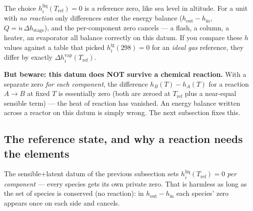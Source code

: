 \documentclass[11pt,a4paper]{article}
\begin{document}
\begin{intuition}
The choice $h^{\mathrm{liq}}_i(T_{\mathrm{ref}}) = 0$ is a reference
zero, like sea level in altitude.  For a unit with \emph{no reaction}
only differences enter the energy balance ($h_{\mathrm{out}} -
h_{\mathrm{in}}$, $Q = \dot{n}\,\Delta h_{\mathrm{stage}}$), and the
per-component zero cancels --- a flash, a column, a heater, an
evaporator all balance correctly on this datum.  If you compare these
$h$ values against a table that picked $h^{\mathrm{ig}}_i(298)=0$ for an
\emph{ideal gas} reference, they differ by exactly
$\Delta h^{\mathrm{vap}}_i(T_{\mathrm{ref}})$.

\textbf{But beware: this datum does NOT survive a chemical reaction.}
With a separate zero \emph{for each component}, the difference
$h_B(T) - h_A(T)$ for a reaction $A\!\to\!B$ at fixed $T$ is essentially
zero (both are zeroed at $T_{\mathrm{ref}}$ plus a near-equal sensible
term) --- the heat of reaction has vanished.  An energy balance written
across a reactor on this datum is simply wrong.  The next subsection
fixes this.
\end{intuition}

\subsection{The reference state, and why a reaction needs the elements}
\label{sec:elements-reference}

The sensible+latent datum of the previous subsection sets
$h^{\mathrm{liq}}_i(T_{\mathrm{ref}}) = 0$ \emph{per component} --- every
species gets its own private zero.  That is harmless as long as the set
of species is conserved (no reaction): in $h_{\mathrm{out}} -
h_{\mathrm{in}}$ each species' zero appears once on each side and
cancels.
\end{document}
